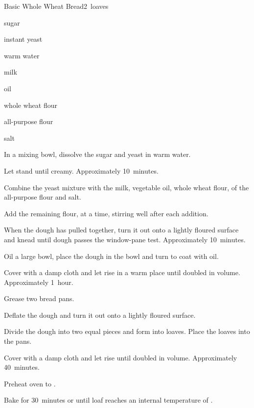 \begin{recipe}{Basic Whole Wheat Bread}{}{2~loaves}

\begin{ingredients}
\item {} sugar
\item {} instant yeast
\item \C{\threequarter} warm water
\item \C{\quarter} milk
\item {} oil
\item {} whole wheat flour
\item {} all-purpose flour
\item {} salt
\end{ingredients}

\begin{directions}
\item In a mixing bowl, dissolve the sugar and yeast in warm water.
\item Let stand until creamy. Approximately 10~minutes.
\item Combine the yeast mixture with the milk, vegetable oil, whole wheat flour,  of the all-purpose flour and salt.
\item Add the remaining flour, \C{\half} at a time, stirring well after each addition.
\item When the dough has pulled together, turn it out onto a lightly floured surface and knead until dough passes the window-pane test. Approximately 10~minutes.
\item Oil a large bowl, place the dough in the bowl and turn to coat with oil.
\item Cover with a damp cloth and let rise in a warm place until doubled in volume. Approximately 1~hour.
\item Grease two bread pans.
\item Deflate the dough and turn it out onto a lightly floured surface.
\item Divide the dough into two equal pieces and form into loaves. Place the loaves into the pans.
\item Cover with a damp cloth and let rise until doubled in volume. Approximately 40~minutes.
\item Preheat oven to .
\item Bake for 30~minutes or until loaf reaches an internal temperature of .
\end{directions}
\end{recipe}
